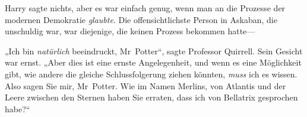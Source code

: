 Harry sagte nichts, aber es war einfach genug, wenn man an die Prozesse der modernen Demokratie \emph{glaubte}. Die offensichtlichste Person in Askaban, die unschuldig war, war diejenige, die keinen Prozess bekommen hatte—

„Ich bin \emph{natürlich} beeindruckt, Mr~Potter“, sagte Professor Quirrell. Sein Gesicht war ernst.
„Aber dies ist eine ernste Angelegenheit, und wenn es eine Möglichkeit gibt, wie andere die gleiche Schlussfolgerung ziehen könnten, \emph{muss} ich es wissen. Also sagen Sie mir, Mr~Potter. Wie im Namen Merlins, von Atlantis und der Leere zwischen den Sternen haben Sie erraten, dass ich von Bellatrix gesprochen habe?“

